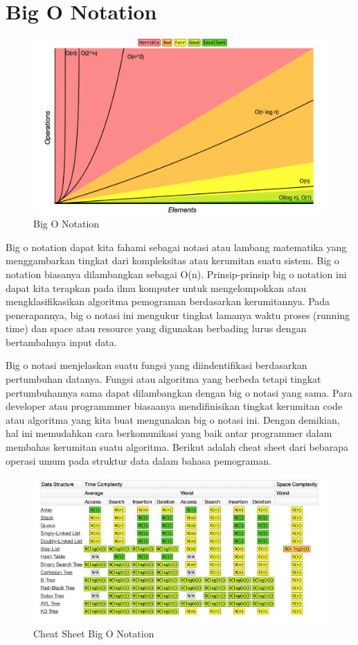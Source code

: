 \section{Big O Notation}
\begin{figure}[H]
        \centerline{\includegraphics[scale=0.3]{figures/algoritma-kompleksitas/bigonotation}}
        \caption{Big O Notation}
\end{figure}
Big o notation dapat kita fahami sebagai notasi atau lambang matematika yang menggambarkan tingkat dari kompleksitas atau kerumitan suatu sistem. Big o notation biasanya dilambangkan sebagai O(n). Prinsip-prinsip big o notation ini dapat kita terapkan pada ilmu komputer untuk mengelompokkan atau mengklasifikasikan algoritma pemograman berdasarkan kerumitannya. Pada penerapannya, big o notasi ini mengukur tingkat lamanya waktu proses (running time) dan space atau resource yang digunakan berbading lurus dengan bertambahnya input data.

Big o notasi menjelaskan suatu fungsi yang diindentifikasi berdasarkan pertumbuhan datanya. Fungsi atau algoritma yang berbeda tetapi tingkat pertumbuhannya sama dapat dilambangkan dengan big o notasi yang sama. Para developer atau programmmer biasaanya mendifinisikan tingkat kerumitan code atau algoritma yang kita buat mengunakan big o notasi ini. Dengan demikian, hal ini memudahkan cara berkomunikasi yang baik antar programmer dalam membahas kerumitan suatu algoritma. Berikut adalah cheat sheet dari bebarapa operasi umum pada struktur data dalam bahasa pemograman.
\begin{figure}[H]
        \centerline{\includegraphics[scale=0.5]{figures/algoritma-kompleksitas/cheatsheetbigonotation}}
        \caption{Cheat Sheet Big O Notation}
\end{figure}

